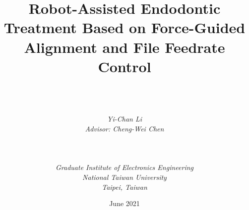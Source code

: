 \documentclass[a4paper, 12pt, twoside, openright]{mythesis}
\begin{document}
\begin{titlepage}
\pagestyle{empty}
\title{\textbf{Robot-Assisted Endodontic Treatment Based on Force-Guided Alignment and File Feedrate Control}}
\author{ \\  \\ \\
{\it Yi-Chan Li}\\
{\it Advisor: Cheng-Wei Chen} \\ \\ \\ \\ 
{\it Graduate Institute of Electronics Engineering}\\
{\it National Taiwan University} \\
{\it Taipei, Taiwan}\\ }
{\date{June 2021}}
\maketitle
\end{titlepage}

\frontmatter %

\tableofcontents
\listoffigures
\listoftables


\titlespacing*{\chapter}{0pt}{-40pt}{35pt}

\mainmatter %












\end{document}

